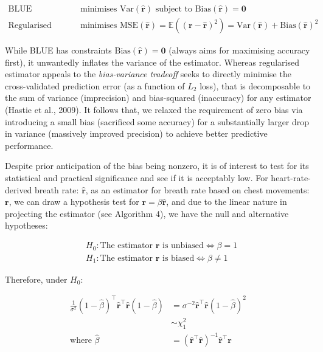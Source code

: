 \documentclass[
]{article}
\begin{document}
\begin{align*}
  \text{BLUE }&\text{minimises Var} (\mathbf{\hat{r}}) \text{ subject to Bias} (\mathbf{\hat{r}}) = \mathbf{0} \\
  \text{Regularised estimator }&\text{minimises MSE} (\mathbf{\hat{r}}) = \mathbb{E}((\mathbf{r} - \mathbf{\hat{r}})^2) = \text{Var}(\mathbf{\hat{r}}) + \text{Bias}(\mathbf{\hat{r}})^2
\end{align*}

While BLUE has constraints
\(\text{Bias}(\mathbf{\hat{r}}) = \mathbf{0}\) (always aims for
maximising accuracy first), it unwantedly inflates the variance of the
estimator. Whereas regularised estimator appeals to the
\emph{bias-variance tradeoff} seeks to directly minimise the
cross-validated prediction error (as a function of \(L_2\) loss), that
is decomposable to the sum of variance (imprecision) and bias-squared
(inaccuracy) for any estimator (Hastie et al., 2009). It follows that,
we relaxed the requirement of zero bias via introducing a small bias
(sacrificed some accuracy) for a substantially larger drop in variance
(massively improved precision) to achieve better predictive performance.

Despite prior anticipation of the bias being nonzero, it is of interest
to test for its statistical and practical significance and see if it is
acceptably low. For heart-rate-derived breath rate:
\(\mathbf{\hat{r}}\), as an estimator for breath rate based on chest
movements: \(\mathbf{r}\), we can draw a hypothesis test for
\(\mathbf{r} = \beta\mathbf{\hat{r}}\), and due to the linear nature in
projecting the estimator (see Algorithm 4), we have the null and
alternative hypotheses:

\begin{align*}
  &H_0: \text{The estimator } \mathbf{\hat{r}} \text{ is unbiased} \iff \beta = 1 \\
  &H_1: \text{The estimator } \mathbf{\hat{r}} \text{ is biased} \iff \beta \neq 1
\end{align*}

Therefore, under \(H_0:\)

\begin{align*}
  \frac{1}{\sigma^2}(1 - \hat{\beta})^\top\mathbf{\hat{r}}^\top\mathbf{\hat{r}}(1 - \hat{\beta}) &= \sigma^{-2}\mathbf{\hat{r}}^\top\mathbf{\hat{r}}(1 - \hat{\beta})^2 \\
  &\sim \chi_1^2 \\
  \text{where } \hat{\beta} &= (\mathbf{\hat{r}}^\top\mathbf{\hat{r}})^{-1}\mathbf{\hat{r}}^\top\mathbf{r}
\end{align*}
\end{document}
